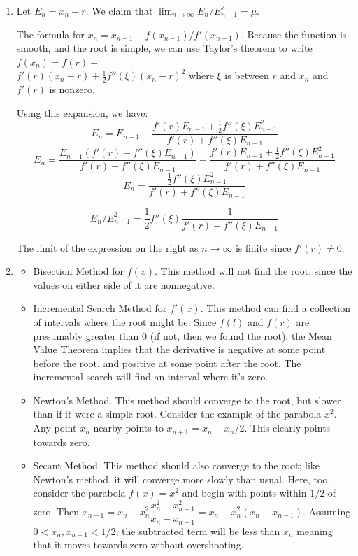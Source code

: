 \documentclass[12pt]{amsart}
\begin{document}
\begin{enumerate}

\item Let $E_n = x_n - r$. We claim that $\lim_{n \to \infty} E_n/ E_{n-1}^2 = \mu$.

The formula for $x_n = x_{n-1} - f(x_{n-1})/f'(x_{n-1})$. Because the function
is smooth, and the root is simple, we can use Taylor's theorem
to write $f(x_n) = f(r) +$ \\ $f'(r)(x_n-r) + \frac{1}{2}f''(\xi)(x_n - r)^2$ where $\xi$ is between $r$ and $x_n$ and $f'(r)$ is nonzero.

Using this expansion, we have:
\[ E_n = E_{n-1} - \dfrac{f'(r)E_{n-1} + \frac{1}{2} f''(\xi)E_{n-1}^2}{f'(r) +  f''(\xi)E_{n-1} }\]
\[ E_n = \dfrac{E_{n-1}(f'(r) +  f''(\xi)E_{n-1} )}{f'(r) +  f''(\xi)E_{n-1} } - \dfrac{f'(r)E_{n-1} + \frac{1}{2} f''(\xi)E_{n-1}^2}{f'(r) +  f''(\xi)E_{n-1} }\]
\[ E_n = \dfrac{\frac{1}{2} f''(\xi)E_{n-1}^2}{f'(r) +  f''(\xi)E_{n-1} }\]

\[ E_n/E_{n-1}^2 = \frac{1}{2}f''(\xi)\dfrac{1}{f'(r) + f''(\xi)E_{n-1}}\]

The limit of the expression on the right as $n\to \infty$ is finite
since $f'(r) \neq 0$.
\vspace{1cm}

\item 
\begin{itemize}
\item Bisection Method for $f(x)$. This method will not find the root,
since the values on either side of it are nonnegative.
\item Incremental Search Method for $f'(x)$. This method 
can find a collection of intervals where the root might be. Since $f(l)$
and $f(r)$ are presumably greater than $0$ (if not, then we found the root),
the Mean Value Theorem implies that the derivative is negative at
some point before the root, and positive at some point after the root. The
incremental search will find an interval where it's zero.
\item Newton's Method. This method should converge to the root, but
slower than if it were a simple root. Consider the example of the parabola
$x^2$.  Any point $x_n$ nearby points to $x_{n+1} = x_n - x_n/2$. This
clearly points towards zero.
\item Secant Method. This method should also converge to the root; like
Newton's method, it will converge more slowly than usual. Here, too, consider
the parabola $f(x) = x^2$ and begin with points within $1/2$ of zero. Then
$x_{n+1} = x_n -x_n^2 \dfrac{x_n^2 - x_{n-1}^2}{x_n - x_{n-1}} = x_n - x_n^2(x_n + x_{n-1})$.
Assuming $0 < x_n, x_{n-1} < 1/2$, the subtracted term will be less than $x_n$ meaning
that it moves towards zero without overshooting.
\end{itemize}

\end{enumerate}
\end{document}
